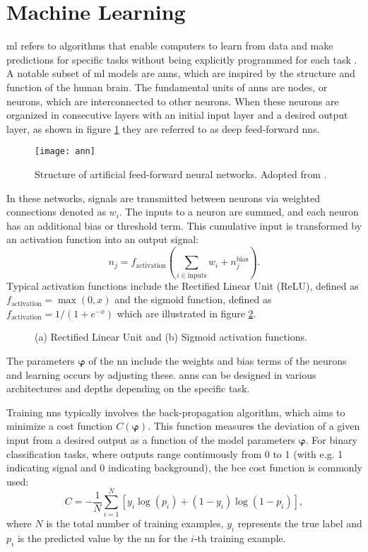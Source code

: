 \section{Machine Learning}
\ac{ml} refers to algorithms that enable computers to learn from data and make predictions for specific tasks without being explicitly programmed for each task \citep{kubat2021introduction}. A notable subset of \ac{ml} models are \acp{ann}, which are inspired by the structure and function of the human brain. The fundamental units of \acp{ann} are nodes, or neurons, which are interconnected to other neurons. When these neurons are organized in consecutive layers with an initial input layer and a desired output layer, as shown in figure \ref{fig:ann} they are referred to as deep feed-forward \acp{nn}.
\begin{figure}
    \centering
    \texttt{[image: ann]}
    \caption[]{Structure of artificial feed-forward neural networks. Adopted from \citep{8114708}.}
    \label{fig:ann}
\end{figure}
In these networks, signals are transmitted between neurons via weighted connections denoted as $w_i$. The inputs to a neuron are summed, and each neuron has an additional bias or threshold term. This cumulative input is transformed by an activation function into an output signal:
\begin{equation}
    n_j=f_\text{activation} \left( \sum_{i\in \text{inputs}} w_i + n_j^\text{bias}\right).
\end{equation}
Typical activation functions include the Rectified Linear Unit (ReLU), defined as $f_\text{activation}=\max(0,x)$ and the sigmoid function, defined as  $f_\text{activation}=1/(1+e^{-x})$ which are illustrated in figure \ref{fig:activation_fun}.
\begin{figure}
    \centering
    \caption[]{(a) Rectified Linear Unit and (b) Sigmoid activation functions.}
    \label{fig:activation_fun}
\end{figure}
The parameters $\bm{\varphi}$ of the \ac{nn} include the weights and bias terms of the neurons and learning occurs by adjusting these. \acp{ann} can be designed in various architectures and depths depending on the specific task.

Training \acp{nn} typically involves the back-propagation algorithm, which aims to minimize a cost  function $C(\bm{\varphi})$. This function measures the deviation of a given input from a desired output as a function of the model parameters $\bm{\varphi}$. For binary classification tasks, where outputs range continuously from 0 to 1 (with e.g. 1 indicating signal and 0 indicating background), the \ac{bce} cost function is commonly used:
\begin{equation}\label{eq:bce}
    C = -\frac{1}{N} \sum_{i=1}^{N} \left[ y_i \log(p_i) + (1 - y_i) \log(1 - p_i) \right],
\end{equation}
where $N$ is the total number of training examples, $y_i$ represents the true label and $p_i$ is the predicted value by the \ac{nn} for the $i$-th training example.

